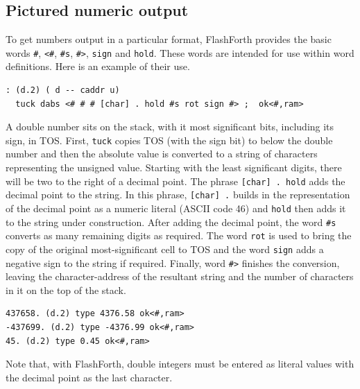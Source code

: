 \documentclass[12pt,a4paper]{article}
\begin{document}
\subsection{Pictured numeric output}
%
To get numbers output in a particular format, FlashForth provides
the basic words \verb!#!, \verb!<#!, \verb!#s!, \verb!#>!, \verb!sign! and \verb!hold!.
These words are intended for use within word definitions.
Here is an example of their use.
\begin{verbatim}
: (d.2) ( d -- caddr u) 
  tuck dabs <# # # [char] . hold #s rot sign #> ;  ok<#,ram>
\end{verbatim}
A double number sits on the stack, with it most significant bits, including its sign, in TOS.
First, \verb!tuck! copies TOS (with the sign bit) to below the double number and 
then the absolute value is converted to a string of characters representing the unsigned
value.
Starting with the least significant digits, there will be two to the right of a decimal point.
The phrase \verb![char] . hold! adds the decimal point to the string.
In this phrase, \verb![char] .! builds in the representation of the decimal point as a numeric literal
(ASCII code 46) and \verb!hold! then adds it to the string under construction.
After adding the decimal point, the word \verb!#s! converts as many remaining digits as required.
The word \verb!rot! is used to bring the copy of the original most-significant cell to TOS
and the word \verb!sign! adds a negative sign to the string if required.
Finally, word \verb!#>! finishes the conversion, leaving the character-address of the resultant string 
and the number of characters in it on the top of the stack.
\begin{verbatim}
437658. (d.2) type 4376.58 ok<#,ram>
-437699. (d.2) type -4376.99 ok<#,ram>
45. (d.2) type 0.45 ok<#,ram>
\end{verbatim}
Note that, with FlashForth, double integers must be entered as literal values with the decimal point 
as the last character.

\bigskip
\end{document}
